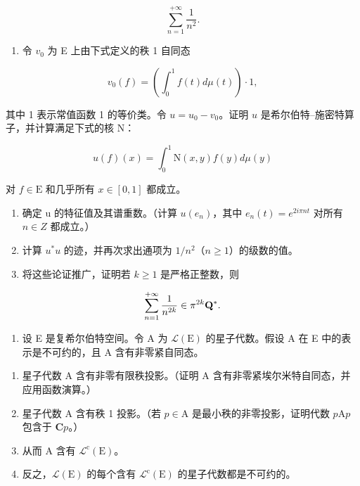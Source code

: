 \[
\sum_ {n = 1} ^ {+ \infty} \frac {1}{n ^ {2}}.
\]

\begin{enumerate}
\def\labelenumi{\alph{enumi})}
\setcounter{enumi}{2}
\tightlist
\item
  令 \(v_{0}\) 为 E 上由下式定义的秩 1 自同态
\end{enumerate}

\[
v _ {0} (f) = \left(\int_ {0} ^ {1} f (t) d \mu (t)\right) \cdot 1,
\]

其中 1 表示常值函数 1 的等价类。令 \(u = u_0 - v_0\)。证明 \(u\) 是希尔伯特–施密特算子，并计算满足下式的核 N：

\[
u (f) (x) = \int_ {0} ^ {1} \mathrm{N} (x, y) f (y) d \mu (y)
\]

对 \(f \in \mathrm{E}\) 和几乎所有 \(x \in [0,1]\) 都成立。

\begin{enumerate}
\def\labelenumi{\alph{enumi})}
\setcounter{enumi}{3}
\item
  确定 u 的特征值及其谱重数。（计算 \(u(e_{n})\)，其中 \(e_{n}(t) = e^{2i\pi nt}\) 对所有 \(n \in Z\) 都成立。）
\item
  计算 \(u^{*}u\) 的迹，并再次求出通项为 \(1/n^{2}\)（\(n \geqslant 1\)）的级数的值。
\item
  将这些论证推广，证明若 \(k \geqslant 1\) 是严格正整数，则
\end{enumerate}

\[
\sum_ {n = 1} ^ {+ \infty} \frac {1}{n ^ {2 k}} \in \pi^ {2 k} {\bf Q} ^ {*}.
\]

\begin{enumerate}
\def\labelenumi{\arabic{enumi})}
\setcounter{enumi}{9}
\tightlist
\item
  设 E 是复希尔伯特空间。令 A 为 \(\mathcal{L}(\mathrm{E})\) 的星子代数。假设 A 在 E 中的表示是不可约的，且 A 含有非零紧自同态。
\end{enumerate}

\begin{enumerate}
\def\labelenumi{\alph{enumi})}
\item
  星子代数 A 含有非零有限秩投影。（证明 A 含有非零紧埃尔米特自同态，并应用函数演算。）
\item
  星子代数 A 含有秩 1 投影。（若 \(p \in \mathrm{A}\) 是最小秩的非零投影，证明代数 \(p\mathrm{A}p\) 包含于 \(\mathbf{C}p\)。）
\item
  从而 A 含有 \(\mathcal{L}^{\mathrm{c}}(\mathrm{E})\)。
\item
  反之，\(\mathcal{L}(\mathrm{E})\) 的每个含有 \(\mathcal{L}^{\mathrm{c}}(\mathrm{E})\) 的星子代数都是不可约的。
\end{enumerate}

